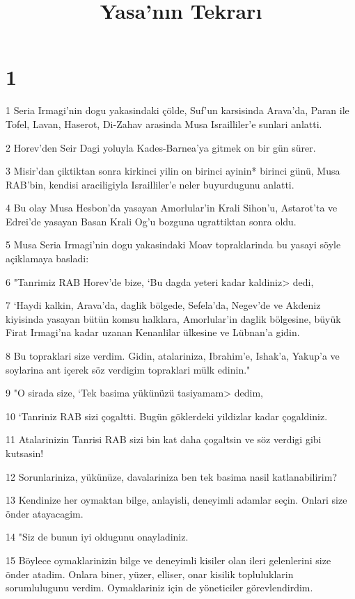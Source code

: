 

\title{Yasa'nın Tekrarı}


\chapter{1}

\par 1 Seria Irmagi'nin dogu yakasindaki çölde, Suf'un karsisinda Arava'da, Paran ile Tofel, Lavan, Haserot, Di-Zahav arasinda Musa Israilliler'e sunlari anlatti.
\par 2 Horev'den Seir Dagi yoluyla Kades-Barnea'ya gitmek on bir gün sürer.
\par 3 Misir'dan çiktiktan sonra kirkinci yilin on birinci ayinin* birinci günü, Musa RAB'bin, kendisi araciligiyla Israilliler'e neler buyurdugunu anlatti.
\par 4 Bu olay Musa Hesbon'da yasayan Amorlular'in Krali Sihon'u, Astarot'ta ve Edrei'de yasayan Basan Krali Og'u bozguna ugrattiktan sonra oldu.
\par 5 Musa Seria Irmagi'nin dogu yakasindaki Moav topraklarinda bu yasayi söyle açiklamaya basladi:
\par 6 "Tanrimiz RAB Horev'de bize, `Bu dagda yeteri kadar kaldiniz> dedi,
\par 7 `Haydi kalkin, Arava'da, daglik bölgede, Sefela'da, Negev'de ve Akdeniz kiyisinda yasayan bütün komsu halklara, Amorlular'in daglik bölgesine, büyük Firat Irmagi'na kadar uzanan Kenanlilar ülkesine ve Lübnan'a gidin.
\par 8 Bu topraklari size verdim. Gidin, atalariniza, Ibrahim'e, Ishak'a, Yakup'a ve soylarina ant içerek söz verdigim topraklari mülk edinin."
\par 9 "O sirada size, `Tek basima yükünüzü tasiyamam> dedim,
\par 10 `Tanriniz RAB sizi çogaltti. Bugün göklerdeki yildizlar kadar çogaldiniz.
\par 11 Atalarinizin Tanrisi RAB sizi bin kat daha çogaltsin ve söz verdigi gibi kutsasin!
\par 12 Sorunlariniza, yükünüze, davalariniza ben tek basima nasil katlanabilirim?
\par 13 Kendinize her oymaktan bilge, anlayisli, deneyimli adamlar seçin. Onlari size önder atayacagim.
\par 14 "Siz de bunun iyi oldugunu onayladiniz.
\par 15 Böylece oymaklarinizin bilge ve deneyimli kisiler olan ileri gelenlerini size önder atadim. Onlara biner, yüzer, elliser, onar kisilik topluluklarin sorumlulugunu verdim. Oymaklariniz için de yöneticiler görevlendirdim.
